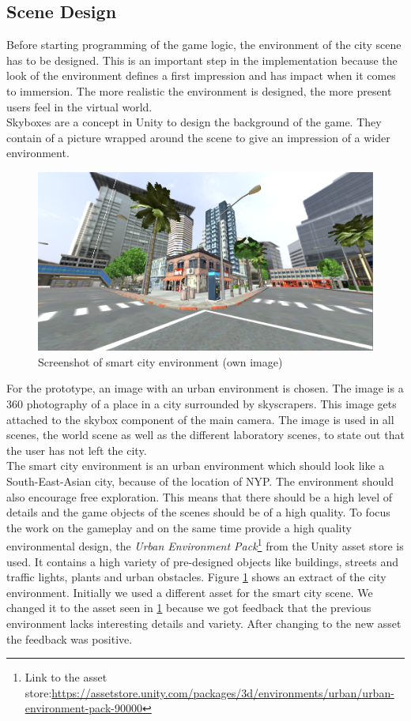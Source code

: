 \subsection{Scene Design}
Before starting programming of the game logic, the environment of the city scene has to be designed. This is an important step in the implementation because the look of the environment defines a first impression and has impact when it comes to immersion. The more realistic the environment is designed, the more present users feel in the virtual world.\\
Skyboxes are a concept in Unity to design the background of the game. They contain of a picture wrapped around the scene to give an impression of a wider environment.
\begin{figure}[h!]
  \includegraphics[width=16cm]{kapitel/explore-world.PNG}
  \centering
  \caption{Screenshot of smart city environment (own image)}
  \label{fig:game-world-scene}
\end{figure}
For the prototype, an image with an urban environment is chosen. The image is a 360 photography of a place in a city surrounded by skyscrapers. This image gets attached to the skybox component of the main camera. The image is used in all scenes, the world scene as well as the different laboratory scenes, to state out that the user has not left the city. \\
The smart city environment is an urban environment which should look like a South-East-Asian city, because of the location of NYP. The environment should also encourage free exploration. This means that there should be a high level of details and the game objects of the scenes should be of a high quality. To focus the work on the gameplay and on the same time provide a high quality environmental design, the \textit{Urban Environment Pack}\footnote{Link to the asset store:\url{https://assetstore.unity.com/packages/3d/environments/urban/urban-environment-pack-90000}} from the Unity asset store is used. It contains a high variety of pre-designed objects like buildings, streets and traffic lights, plants and urban obstacles. Figure \ref{fig:game-world-scene} shows an extract of the city environment. Initially we used a different asset for the smart city scene. We changed it to the asset seen in \ref{fig:game-world-scene} because we got feedback that the previous environment lacks interesting details and variety. After changing to the new asset the feedback was positive.
